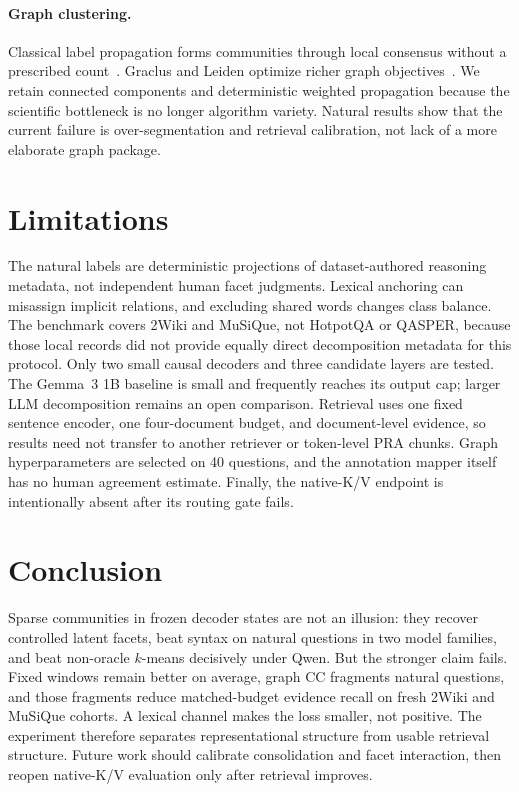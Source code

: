 \documentclass[11pt]{article}
\begin{document}
\paragraph{Graph clustering.}
Classical label propagation forms communities through local consensus without a prescribed count~\cite{raghavan2007label}. Graclus and Leiden optimize richer graph objectives~\cite{dhillon2007graclus,traag2019leiden}. We retain connected components and deterministic weighted propagation because the scientific bottleneck is no longer algorithm variety. Natural results show that the current failure is over-segmentation and retrieval calibration, not lack of a more elaborate graph package.

\section{Limitations}
The natural labels are deterministic projections of dataset-authored reasoning metadata, not independent human facet judgments. Lexical anchoring can misassign implicit relations, and excluding shared words changes class balance. The benchmark covers 2Wiki and MuSiQue, not HotpotQA or QASPER, because those local records did not provide equally direct decomposition metadata for this protocol. Only two small causal decoders and three candidate layers are tested. The Gemma~3 1B baseline is small and frequently reaches its output cap; larger LLM decomposition remains an open comparison. Retrieval uses one fixed sentence encoder, one four-document budget, and document-level evidence, so results need not transfer to another retriever or token-level PRA chunks. Graph hyperparameters are selected on 40 questions, and the annotation mapper itself has no human agreement estimate. Finally, the native-K/V endpoint is intentionally absent after its routing gate fails.

\section{Conclusion}
Sparse communities in frozen decoder states are not an illusion: they recover controlled latent facets, beat syntax on natural questions in two model families, and beat non-oracle $k$-means decisively under Qwen. But the stronger claim fails. Fixed windows remain better on average, graph CC fragments natural questions, and those fragments reduce matched-budget evidence recall on fresh 2Wiki and MuSiQue cohorts. A lexical channel makes the loss smaller, not positive. The experiment therefore separates representational structure from usable retrieval structure. Future work should calibrate consolidation and facet interaction, then reopen native-K/V evaluation only after retrieval improves.
\end{document}
